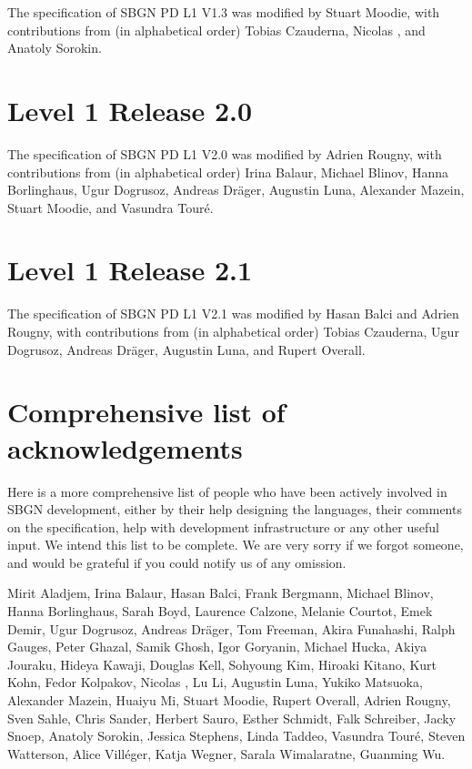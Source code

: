 The specification of SBGN PD L1 V1.3 was modified by Stuart Moodie, with contributions from (in alphabetical order) Tobias Czauderna, Nicolas \lenov{}, and Anatoly Sorokin.

\section{Level 1 Release 2.0}

The specification of SBGN PD L1 V2.0 was modified by Adrien Rougny, with contributions from (in alphabetical order) Irina Balaur, Michael Blinov, Hanna Borlinghaus, Ugur Dogrusoz, Andreas Dräger, Augustin Luna, Alexander Mazein, Stuart Moodie, and Vasundra Touré.

\section{Level 1 Release 2.1}

The specification of SBGN PD L1 V2.1 was modified by Hasan Balci and Adrien Rougny, with contributions from (in alphabetical order) Tobias Czauderna, Ugur Dogrusoz, Andreas Dräger, Augustin Luna, and Rupert Overall.


\section{Comprehensive list of acknowledgements}

Here is a more comprehensive list of people who have been actively involved in SBGN development, either by their help designing the languages, their comments on the specification, help with development infrastructure or any other useful input.  We intend this list to be complete. We are very sorry if we forgot someone, and would be grateful if you could notify us of any omission.

Mirit Aladjem, Irina Balaur, Hasan Balci, Frank Bergmann, Michael Blinov, Hanna Borlinghaus, Sarah Boyd, Laurence Calzone, Melanie Courtot, Emek Demir, Ugur Dogrusoz, Andreas Dräger, Tom Freeman, Akira Funahashi, Ralph Gauges, Peter Ghazal, Samik Ghosh, Igor Goryanin, Michael Hucka, Akiya Jouraku, Hideya Kawaji, Douglas Kell, Sohyoung Kim, Hiroaki Kitano, Kurt Kohn, Fedor Kolpakov, Nicolas \lenov{}, Lu Li, Augustin Luna, Yukiko Matsuoka, Alexander Mazein, Huaiyu Mi, Stuart Moodie, Rupert Overall, Adrien Rougny, Sven Sahle, Chris Sander, Herbert Sauro, Esther Schmidt, Falk Schreiber, Jacky Snoep, Anatoly Sorokin, Jessica Stephens, Linda Taddeo, Vasundra Touré, Steven Watterson, Alice Vill\'{e}ger, Katja Wegner, Sarala Wimalaratne, Guanming Wu.


